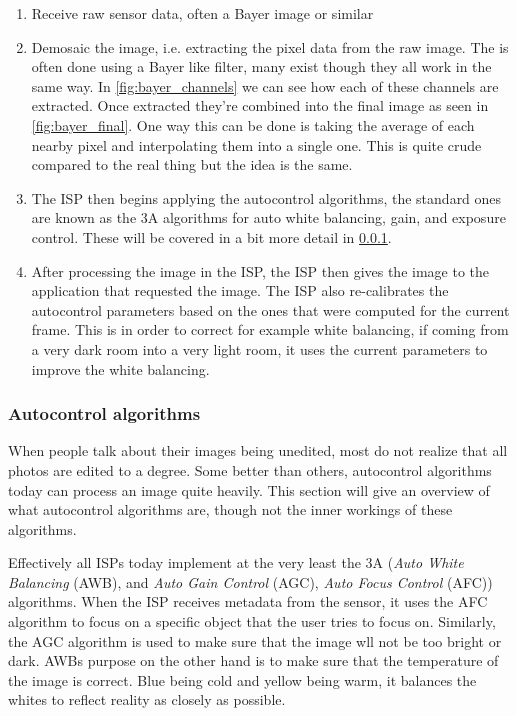 \begin{enumerate}
    \item Receive raw sensor data, often a Bayer image or similar

    \item Demosaic the image, i.e. extracting the pixel data from the raw
        image. The is often done using a Bayer like filter, many exist though
        they all work in the same way. In \cref{fig:bayer_channels} we can see
        how each of these channels are extracted. Once extracted they're
        combined into the final image as seen in \cref{fig:bayer_final}. One
        way this can be done is taking the average of each nearby pixel and
        interpolating them into a single one. This is quite crude compared to
        the real thing but the idea is the same.

    \item The ISP then begins applying the autocontrol algorithms, the standard
        ones are known as the 3A algorithms for auto white balancing, gain, and
        exposure control. These will be covered in a bit more detail in
        \cref{section:autocontrol}.

    \item After processing the image in the ISP, the ISP then gives the image
        to the application that requested the image. The ISP also re-calibrates
        the autocontrol parameters based on the ones that were computed for the
        current frame. This is in order to correct for example white balancing,
        if coming from a very dark room into a very light room, it uses the
        current parameters to improve the white balancing.

\end{enumerate}

\subsubsection{Autocontrol algorithms} \label{section:autocontrol}

When people talk about their images being unedited, most do not realize that all
photos are edited to a degree. Some better than others, autocontrol algorithms
today can process an image quite heavily. This section will give an overview of
what autocontrol algorithms are, though not the inner workings of these
algorithms.

Effectively all ISPs today implement at the very least the 3A (\textit{Auto
White Balancing} (AWB), and \textit{Auto Gain Control} (AGC), \textit{Auto
Focus Control} (AFC)) algorithms. When the ISP receives metadata from the
sensor, it uses the AFC algorithm to focus on a specific object that the user
tries to focus on. Similarly, the AGC algorithm is used to make sure that the
image wll not be too bright or dark. AWBs purpose on the other hand is to make
sure that the temperature of the image is correct. Blue being cold and yellow
being warm, it balances the whites to reflect reality as closely as possible.

